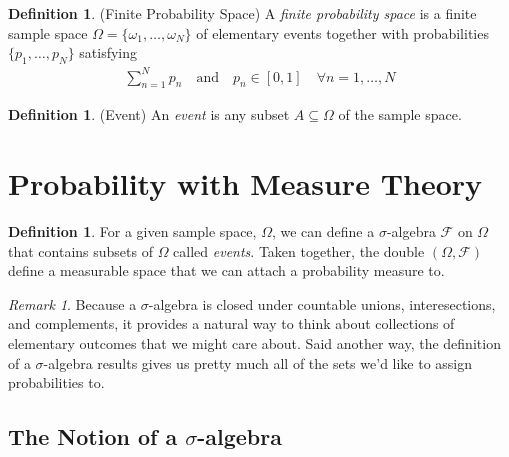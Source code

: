 \documentclass[12pt]{article}
\theoremstyle{plain}
\theoremstyle{definition}
\newtheorem{defn}[thm]{Definition}
\theoremstyle{remark}
\newtheorem*{rmk}{Remark}
\newcommand{\sumnN}{\sum^N_{n=1}}
\begin{document}
\begin{defn}{(Finite Probability Space)}
A \emph{finite probability space} is a finite sample space
$\Omega=\{\omega_1,\ldots,\omega_N\}$ of elementary events together with
probabilities $\{p_1,\ldots,p_N\}$ satisfying
\begin{align*}
  \sumnN p_n
  \quad\text{and}\quad
  p_n \in [0,1] \quad \forall n=1,\ldots,N
\end{align*}
\end{defn}
\begin{defn}{(Event)}
An \emph{event} is any subset $A\subseteq \Omega$ of the sample space.
\end{defn}



\section{Probability with Measure Theory}


\begin{defn}
For a given sample space, $\Omega$, we can define a $\sigma$-algebra
$\mathscr{F}$ on $\Omega$ that contains subsets of $\Omega$ called
\emph{events}. Taken together, the double $(\Omega,\mathscr{F})$ define
a measurable space that we can attach a probability measure to.
\end{defn}
\begin{rmk}
Because a $\sigma$-algebra is closed under countable unions,
interesections, and complements, it provides a natural way to think
about collections of elementary outcomes that we might care about. Said
another way, the definition of a $\sigma$-algebra results gives us
pretty much all of the sets we'd like to assign probabilities to.
\end{rmk}

\subsection{The Notion of a $\sigma$-algebra}
\end{document}
